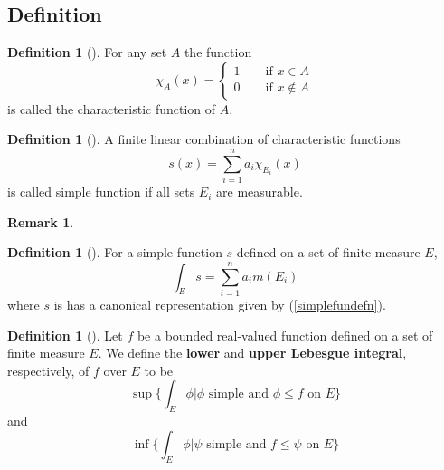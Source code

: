 \documentclass[	DIV=calc,paper=a4,fontsize=11pt]{scrartcl}	 	%
\theoremstyle{definition}
\newtheorem{defn}[thm]{Definition}
\newtheorem{rem}[thm]{Remark}
\theoremstyle{plain}
\theoremstyle{remark}
\begin{document}
\subsection{Definition}

\begin{defn}[\textbf{\color{blue}{Characteristic Function}}]
For any set $A$ the function
\[\chi_A(x)=
\begin{cases}
1 \qquad \text{if } x\in A\\
0\qquad \text{if } x\notin A
\end{cases}
\]
is called the characteristic function of $A$.
\end{defn}

\begin{defn}[\textbf{\color{blue}{Simple Function}}]
A finite linear combination of characteristic functions
\begin{equation}\label{simplefundefn}
s(x) = \sum_{i=1}^{n}a_i \chi_{E_i}(x)
\end{equation}
is called simple function if all sets $E_i$ are measurable.
\end{defn}

\begin{rem}\color{red}
\end{rem}

\begin{defn}[\textbf{\color{blue}{Lebesgue integral for simple function}}]
For a simple function $s$ defined on a set of finite measure $E$,
\[\int_E s=\sum_{i=1}^{n}a_i m(E_i)\]
where $s$ is has a canonical representation given by (\ref{simplefundefn}).
\end{defn}
\begin{defn}[\textbf{\color{blue}{Lower and upper integral}}]
Let $f$ be a bounded real-valued function defined on a set of finite measure $E$. We define the \textbf{lower} and \textbf{upper Lebesgue integral}, respectively, of $f$ over $E$ to be
\[\sup\biggl\{\int_E \phi\biggl|\phi \text{ simple and }\phi\le f \text{ on }E \biggl\}\]
and
\[\inf\biggl\{\int_E \phi\biggl|\psi \text{ simple and }f\le\psi \text{ on }E \biggl\}\]
\end{defn}
\end{document}
